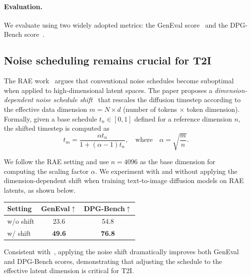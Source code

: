 \documentclass[10pt,twocolumn,letterpaper]{article}
\begin{document}
\paragraph{Evaluation.} 
We evaluate using two widely adopted metrics: the GenEval score~\citep{ghosh2023geneval} and the DPG-Bench score~\citep{hu2024ella}. 


\subsection{Noise scheduling remains crucial for T2I}
The RAE work~\citep{zheng2025diffusion} argues that conventional noise schedules become suboptimal when applied to high-dimensional latent spaces. 
The paper proposes a \emph{dimension-dependent noise schedule shift}~\citep{SD3} that rescales the diffusion timestep according to the effective data dimension $m = N \times d$ (number of tokens $\times$ token dimension). Formally, given a base schedule $t_n \in [0, 1]$ defined for a reference dimension $n$, the shifted timestep is computed as
\vspace{-0.3em}
\begin{equation*}
t_m = \frac{\alpha t_n}{1 + (\alpha - 1)t_n}, \quad \text{where} \quad \alpha = \sqrt{\frac{m}{n}}.
\end{equation*}
\vspace{-0.3em}

We follow the RAE setting and use $n{=}4096$ as the base dimension for computing the scaling factor $\alpha$.
We experiment with and without applying the dimension-dependent shift when training text-to-image diffusion models on RAE latents, as shown below. 

\begin{center}
{
\setlength{\tabcolsep}{6pt} %
\begin{tabular}{l|cc}
    \small
    \textbf{Setting} & \textbf{GenEval}$\uparrow$ & \textbf{DPG-Bench}$\uparrow$ \\
    \midrule
    w/o shift & 23.6 & 54.8 \\
    w/ shift    & \textbf{49.6} & \textbf{76.8} \\
\end{tabular}
}
\end{center}



Consistent with~\citet{zheng2025diffusion}, applying the noise shift dramatically improves both GenEval and DPG-Bench scores, demonstrating that adjusting the schedule to the effective latent dimension is critical for T2I. 
\end{document}
